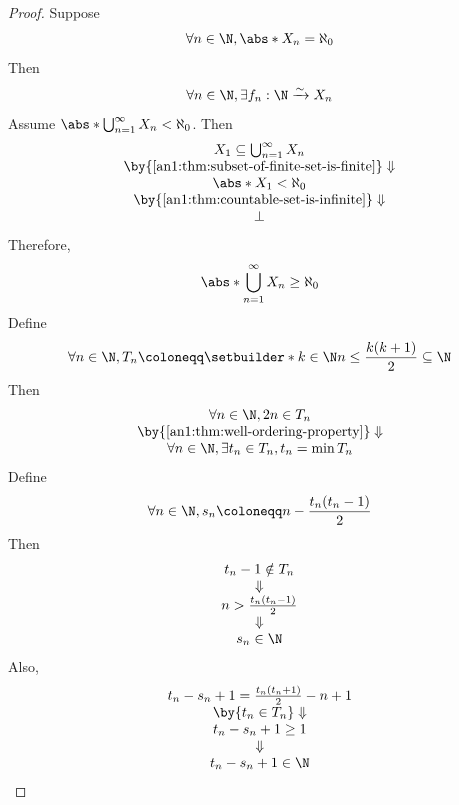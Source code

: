 \begin{proof}
  Suppose
  \[
    \forall n \in \N, \abs*{X_{n}} = \aleph_{0}
  \]
  Then
  \[
    \forall n \in \N, \exists f_{n}: \N \xrightarrow{\sim} X_{n}
  \]
  Assume $\abs*{\bigcup_{n = 1}^{\infty} X_{n}} < \aleph_{0}$. Then
  \[
    \begin{array}{c}
      X_{1} \subseteq \bigcup_{n = 1}^{\infty} X_{n}                \\
      \by{\Cref{an1:thm:subset-of-finite-set-is-finite}} \Downarrow \\
      \abs*{X_{1}} < \aleph_{0}                                     \\
      \by{\Cref{an1:thm:countable-set-is-infinite}} \Downarrow      \\
      \bot
    \end{array}
  \]
  Therefore,
  \[
    \abs*{\bigcup_{n = 1}^{\infty} X_{n}} \geq \aleph_{0}
  \]
  Define
  \[
    \forall n \in \N, T_{n} \coloneqq \setbuilder*{k \in \N}{n \leq \frac{k(k + 1)}{2}} \subseteq \N
  \]
  Then
  \[
    \begin{array}{c}
      \forall n \in \N, 2n \in T_{n}                        \\
      \by{\Cref{an1:thm:well-ordering-property}} \Downarrow \\
      \forall n \in \N, \exists t_{n} \in T_{n}, t_{n} = \min T_{n}
    \end{array}
  \]
  Define
  \[
    \forall n \in \N, s_{n} \coloneqq n - \frac{t_{n}(t_{n} - 1)}{2}
  \]
  Then
  \[
    \begin{array}{c}
      t_{n} - 1 \notin T_{n}         \\
      \Downarrow                     \\
      n > \frac{t_{n}(t_{n} - 1)}{2} \\
      \Downarrow                     \\
      s_{n} \in \N
    \end{array}
  \]
  Also,
  \[
    \begin{array}{c}
      t_{n} - s_{n} + 1 = \frac{t_{n}(t_{n} + 1)}{2} - n + 1 \\
      \by{\ensuremath{t_{n} \in T_{n}}} \Downarrow           \\
      t_{n} - s_{n} + 1 \geq 1                               \\
      \Downarrow                                             \\
      t_{n} - s_{n} + 1 \in \N
    \end{array}
\]
\end{proof}
